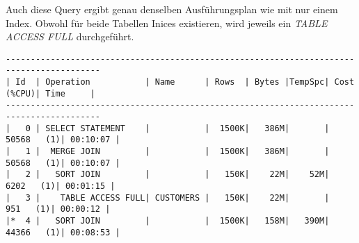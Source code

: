 \documentclass[11pt,a4paper,parskip=half]{scrartcl}
\begin{document}
Auch diese Query ergibt genau denselben Ausführungsplan wie mit nur einem Index. Obwohl für beide Tabellen Inices existieren, wird jeweils ein \emph{TABLE ACCESS FULL} durchgeführt.
\begin{lstlisting}
-----------------------------------------------------------------------------------------                                                                                                                                                                                                                    
| Id  | Operation           | Name      | Rows  | Bytes |TempSpc| Cost (%CPU)| Time     |                                                                                                                                                                                                                    
-----------------------------------------------------------------------------------------                                                                                                                                                                                                                    
|   0 | SELECT STATEMENT    |           |  1500K|   386M|       | 50568   (1)| 00:10:07 |                                                                                                                                                                                                                    
|   1 |  MERGE JOIN         |           |  1500K|   386M|       | 50568   (1)| 00:10:07 |                                                                                                                                                                                                                    
|   2 |   SORT JOIN         |           |   150K|    22M|    52M|  6202   (1)| 00:01:15 |                                                                                                                                                                                                                    
|   3 |    TABLE ACCESS FULL| CUSTOMERS |   150K|    22M|       |   951   (1)| 00:00:12 |                                                                                                                                                                                                                    
|*  4 |   SORT JOIN         |           |  1500K|   158M|   390M| 44366   (1)| 00:08:53 |                                                                                                                                                                                                                    

\end{lstlisting}
\end{document}
